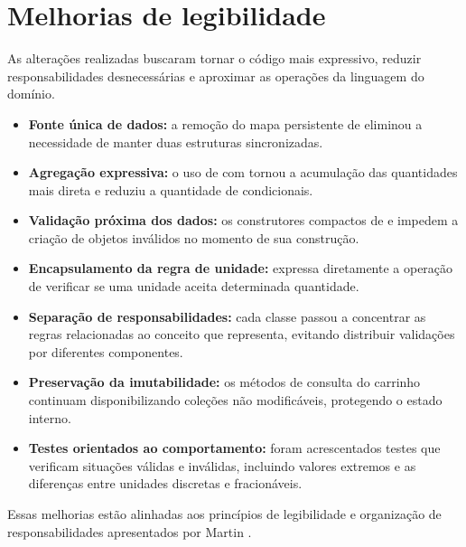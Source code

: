 \section{Melhorias de legibilidade}

As alterações realizadas buscaram tornar o código mais expressivo, reduzir responsabilidades desnecessárias e aproximar as operações da linguagem do domínio.

\begin{itemize}

\item \textbf{Fonte única de dados:} a remoção do mapa persistente de  eliminou a necessidade de manter duas estruturas sincronizadas.

\item \textbf{Agregação expressiva:} o uso de  com  tornou a acumulação das quantidades mais direta e reduziu a quantidade de condicionais.

\item \textbf{Validação próxima dos dados:} os construtores compactos de  e  impedem a criação de objetos inválidos no momento de sua construção.

\item \textbf{Encapsulamento da regra de unidade:}  expressa diretamente a operação de verificar se uma unidade aceita determinada quantidade.

\item \textbf{Separação de responsabilidades:} cada classe passou a concentrar as regras relacionadas ao conceito que representa, evitando distribuir validações por diferentes componentes.

\item \textbf{Preservação da imutabilidade:} os métodos de consulta do carrinho continuam disponibilizando coleções não modificáveis, protegendo o estado interno.

\item \textbf{Testes orientados ao comportamento:} foram acrescentados testes que verificam situações válidas e inválidas, incluindo valores extremos e as diferenças entre unidades discretas e fracionáveis.

\end{itemize}

Essas melhorias estão alinhadas aos princípios de legibilidade e organização de responsabilidades apresentados por Martin \cite{martin2011}.

